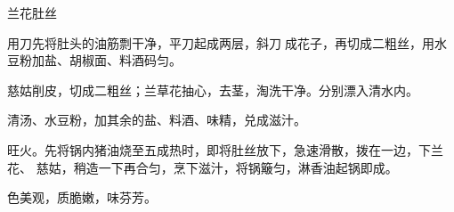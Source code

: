 %
%
%
%
%
%
%
\begin{recipe}{兰花肚丝}

\ingredients


\preparation

\step 用刀先将肚头的油筋剽干净，平刀起成两层，斜刀𠟤成花子，再切成二粗丝，用水
豆粉加盐、胡椒面、料酒码匀。

\step 慈姑削皮，切成二粗丝；兰草花抽心，去茎，淘洗干净。分别漂入清水内。

\step 清汤、水豆粉，加其余的盐、料酒、味精，兑成滋汁。

\step 旺火。先将锅内猪油烧至五成热时，即将肚丝放下，急速滑散，拨在一边，下兰花、
慈姑，稍造一下再合匀，烹下滋汁，将锅簸匀，淋香油起锅即成。

\features

色美观，质脆嫩，味芬芳。

\end{recipe}

